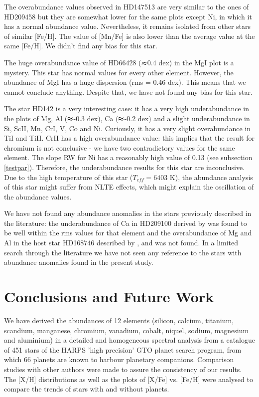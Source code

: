 \documentclass[dvips,12pt,a4paper]{report}
\begin{document}
{{The overabundance values observed in HD147513 are very similar to the ones of HD209458 but they are somewhat lower for the same plots except Ni, in which it has a normal abundance value. Nevertheless, it remains isolated from other stars of similar [Fe/H]. The value of [Mn/Fe] is also lower than the average value at the same [Fe/H]. We didn't find any bias for this star.

The huge overabundance value of HD66428 ($\thickapprox$0.4 dex) in the MgI plot is a mystery. This star has normal values for every other element. However, the abundance of MgI has a huge dispersion (rms = 0.46 dex). This means that we cannot conclude anything. Despite that, we have not found any bias for this star.

The star HD142 is a very interesting case: it has a very high underabundance in the plots of Mg, Al ($\thickapprox$-0.3 dex), Ca ($\thickapprox$-0.2 dex) and a slight underabundance in Si, ScII, Mn, CrI, V, Co and Ni. Curiously, it has a very slight overabundance in TiI and TiII. CrII has a high overabundance value: this implies that the result for chromium is not conclusive - we have two contradictory values for the same element. The slope RW for Ni has a reasonably high value of 0.13 (see subsection \ref{testpar}). Therefore, the underabundance results for this star are inconclusive. Due to the high temperature of this star ($T_{eff}=6403$ K), the abundance analysis of this star might suffer from NLTE effects, which might explain the oscillation of the abundance values.

We have not found any abundance anomalies in the stars previously described in the literature: the underabundance of Ca in HD209100 derived by \citet{Bodaghee-2003} was found to be well within the rms values for that element and the overabundance of Mg and Al in the host star HD168746 described by \citet{Sadakane-2002}, \citet{Laws-2003} and \citet{Gilli-2006}  was not found. In a limited search through the literature we have not seen any reference to the stars with abundance anomalies found in the present study.

\chapter{Conclusions and Future Work}

We have derived the abundances of 12 elements (silicon, calcium, titanium, scandium, manganese, chromium, vanadium, cobalt, niquel, sodium, magnesium and aluminium) in a detailed and homogeneous spectral analysis from a catalogue of 451 stars of the HARPS 'high precision' GTO planet search program, from which 66 planets are known to harbour planetary companions. Comparison studies with other authors were made to assure the consistency of our results. The [X/H] distributions as well as the plots of [X/Fe] vs. [Fe/H] were analysed to compare the trends of stars with and without planets.

}}
\end{document}
